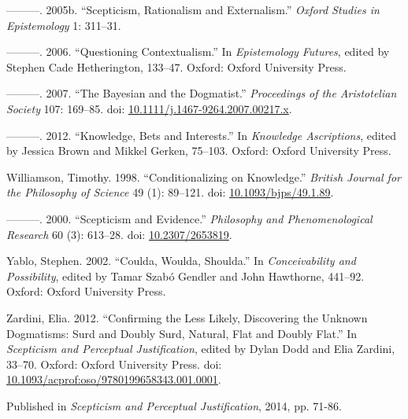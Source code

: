 \documentclass[
  11pt,
  letterpaper,
  DIV=11,
  numbers=noendperiod,
  twoside]{scrartcl}
\newlength{\cslhangindent}
\newenvironment{CSLReferences}[2] %
 {\begin{list}{}{%
  \setlength{\itemindent}{0pt}
  \setlength{\leftmargin}{0pt}
  \setlength{\parsep}{0pt}
  \ifodd #1
   \setlength{\leftmargin}{\cslhangindent}
   \setlength{\itemindent}{-1\cslhangindent}
  \fi
  \setlength{\itemsep}{#2\baselineskip}}}
 {\end{list}}
\begin{document}
\begin{CSLReferences}{1}{0}
---------. 2005b. {``Scepticism, Rationalism and Externalism.''}
\emph{Oxford Studies in Epistemology} 1: 311--31.

---------. 2006. {``Questioning Contextualism.''} In \emph{Epistemology
Futures}, edited by Stephen Cade Hetherington, 133--47. Oxford: Oxford
University Press.

---------. 2007. {``The Bayesian and the Dogmatist.''} \emph{Proceedings
of the Aristotelian Society} 107: 169--85. doi:
\href{https://doi.org/10.1111/j.1467-9264.2007.00217.x}{10.1111/j.1467-9264.2007.00217.x}.

---------. 2012. {``Knowledge, Bets and Interests.''} In \emph{Knowledge
Ascriptions}, edited by Jessica Brown and Mikkel Gerken, 75--103.
Oxford: Oxford University Press.

Williamson, Timothy. 1998. {``{Conditionalizing on Knowledge}.''}
\emph{British Journal for the Philosophy of Science} 49 (1): 89--121.
doi: \href{https://doi.org/10.1093/bjps/49.1.89}{10.1093/bjps/49.1.89}.

---------. 2000. {``{Scepticism and Evidence}.''} \emph{Philosophy and
Phenomenological Research} 60 (3): 613--28. doi:
\href{https://doi.org/10.2307/2653819}{10.2307/2653819}.

Yablo, Stephen. 2002. {``Coulda, Woulda, Shoulda.''} In
\emph{Conceivability and Possibility}, edited by Tamar Szabó Gendler and
John Hawthorne, 441--92. Oxford: Oxford University Press.

Zardini, Elia. 2012. {``Confirming the Less Likely, Discovering the
Unknown Dogmatisms: Surd and Doubly Surd, Natural, Flat and Doubly
Flat.''} In \emph{Scepticism and Perceptual Justification}, edited by
Dylan Dodd and Elia Zardini, 33--70. Oxford: Oxford University Press.
doi:
\href{https://doi.org/10.1093/acprof:oso/9780199658343.001.0001}{10.1093/acprof:oso/9780199658343.001.0001}.

\end{CSLReferences}



\noindent Published in\emph{
Scepticism and Perceptual Justification}, 2014, pp. 71-86.
\end{document}
